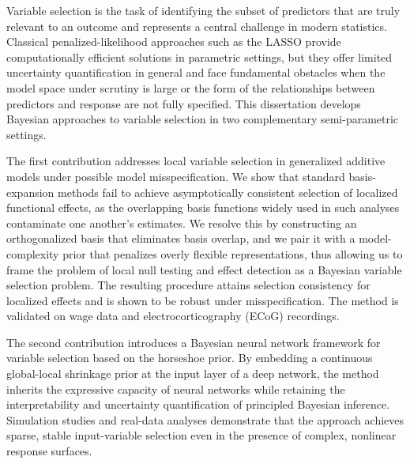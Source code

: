 \thesisabstract
{
  Variable selection is the task of identifying the subset of predictors that are truly
  relevant to an outcome and represents a central challenge in modern statistics.
  Classical penalized-likelihood approaches such as the LASSO provide
  computationally efficient solutions in parametric settings, but they
  offer limited uncertainty quantification in general and face fundamental 
  obstacles when the model space under scrutiny is large or the form of the relationships between predictors and response are not fully specified.  This dissertation develops Bayesian approaches to variable selection in two complementary semi-parametric settings.

  The first contribution addresses local variable selection in generalized
  additive models under possible model misspecification.  We show that
  standard basis-expansion methods fail to achieve asymptotically
  consistent selection of localized functional effects, as the overlapping
  basis functions widely used in such analyses contaminate one another's estimates.  We resolve this by constructing an orthogonalized basis that eliminates basis overlap, and we pair it with a model-complexity prior that penalizes overly
  flexible representations, thus allowing us to frame the problem of local null testing and effect detection as a Bayesian variable selection problem.  The resulting procedure attains selection consistency for localized effects and is shown to be robust under misspecification.  The method is validated on 
  wage data and electrocorticography (ECoG) recordings.

  The second contribution introduces a Bayesian neural network framework
  for variable selection based on the horseshoe prior.  By embedding
  a continuous global-local shrinkage prior at the input layer of a
  deep network, the method inherits the expressive capacity of neural
  networks while retaining the interpretability and uncertainty
  quantification of principled Bayesian inference.  Simulation studies
  and real-data analyses demonstrate that the approach achieves sparse,
  stable input-variable selection even in the presence of complex,
  nonlinear response surfaces.
}


